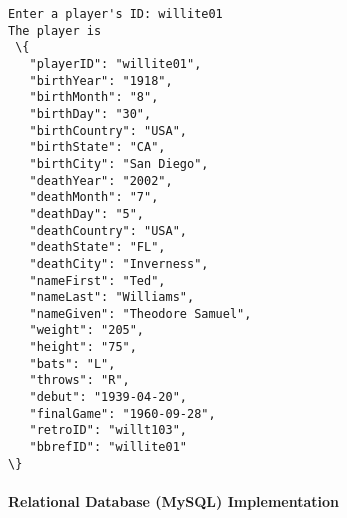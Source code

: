 \documentclass[11pt]{article}
\begin{document}
    \begin{Verbatim}[commandchars=\\\{\}]
Enter a player's ID: willite01
The player is 
 \{
   "playerID": "willite01",
   "birthYear": "1918",
   "birthMonth": "8",
   "birthDay": "30",
   "birthCountry": "USA",
   "birthState": "CA",
   "birthCity": "San Diego",
   "deathYear": "2002",
   "deathMonth": "7",
   "deathDay": "5",
   "deathCountry": "USA",
   "deathState": "FL",
   "deathCity": "Inverness",
   "nameFirst": "Ted",
   "nameLast": "Williams",
   "nameGiven": "Theodore Samuel",
   "weight": "205",
   "height": "75",
   "bats": "L",
   "throws": "R",
   "debut": "1939-04-20",
   "finalGame": "1960-09-28",
   "retroID": "willt103",
   "bbrefID": "willite01"
\}

    \end{Verbatim}

    \paragraph{Relational Database (MySQL)
Implementation}\label{relational-database-mysql-implementation}
\end{document}
